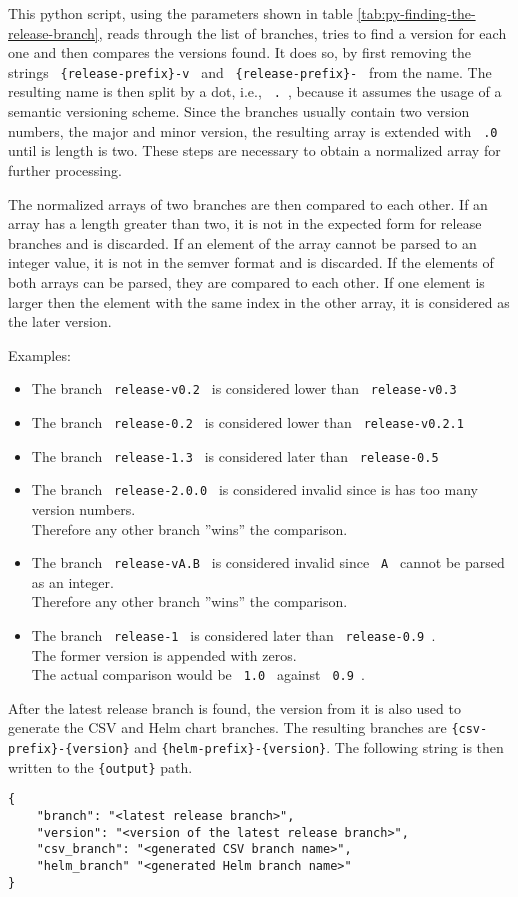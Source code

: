 This python script, using the parameters shown in table \ref{tab:py-finding-the-release-branch}, reads through the list of branches, tries to find a version for each one and then compares the versions found.
It does so, by first removing the strings \verb| {release-prefix}-v | and \verb| {release-prefix}- | from the name.
The resulting name is then split by a dot, i.e., \verb| . |, because it assumes the usage of a semantic versioning scheme.
Since the branches usually contain two version numbers, the major and minor version, the resulting array is extended with \verb| .0 | until is length is two.
These steps are necessary to obtain a normalized array for further processing.

The normalized arrays of two branches are then compared to each other.
If an array has a length greater than two, it is not in the expected form for release branches and is discarded.
If an element of the array cannot be parsed to an integer value, it is not in the semver format and is discarded.
If the elements of both arrays can be parsed, they are compared to each other.
If one element is larger then the element with the same index in the other array, it is considered as the later version.

Examples:
\begin{itemize}
    \item The branch \verb| release-v0.2 | is considered lower than \verb| release-v0.3 |
    \item The branch \verb| release-0.2 |  is considered lower than \verb| release-v0.2.1 |
    \item The branch \verb| release-1.3 | is considered later than \verb| release-0.5 |
    \item The branch \verb| release-2.0.0 | is considered invalid since is has too many version numbers. \\ Therefore any other branch ''wins'' the comparison.
    \item The branch \verb| release-vA.B | is considered invalid since \verb| A | cannot be parsed as an integer. \\ Therefore any other branch ''wins'' the comparison.
    \item The branch \verb| release-1 | is considered later than \verb| release-0.9 |. \\ The former version is appended with zeros. \\ The actual comparison would be \verb| 1.0 | against \verb| 0.9 |.
\end{itemize}

After the latest release branch is found, the version from it is also used to generate the CSV and Helm chart branches.
The resulting branches are \verb`{csv-prefix}-{version}` and \verb`{helm-prefix}-{version}`.
The following string is then written to the \verb`{output}` path.

\begin{verbatim}
{
    "branch": "<latest release branch>",
    "version": "<version of the latest release branch>",
    "csv_branch": "<generated CSV branch name>",
    "helm_branch" "<generated Helm branch name>"
}
\end{verbatim}
